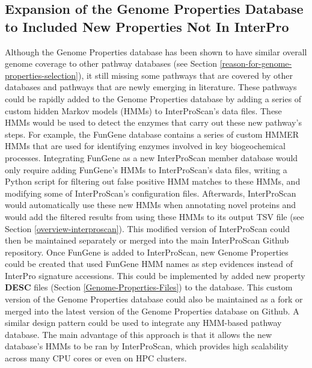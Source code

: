 \subsection{Expansion of the Genome Properties Database to Included New Properties Not In InterPro}

Although the Genome Properties database has been shown to have similar overall genome coverage to other pathway databases (see Section \ref{reason-for-genome-properties-selection}), it still missing some pathways that are covered by other databases and pathways that are newly emerging in literature. These pathways could be rapidly added to the Genome Properties database by adding a series of custom hidden Markov models (HMMs) \cite{eddy2011accelerated} to InterProScan's data files. These HMMs would be used to detect the enzymes that carry out these new pathway's steps. For example, the FunGene \cite{fish2013fungene} database contains a series of custom HMMER \cite{eddy2011accelerated} HMMs that are used for identifying enzymes involved in key biogeochemical processes. Integrating FunGene as a new InterProScan member database would only require adding FunGene's HMMs to InterProScan's data files, writing a Python script for filtering out false positive HMM matches to these HMMs, and modifying some of InterProScan's configuration files. Afterwards, InterProScan would automatically use these new HMMs when annotating novel proteins and would add the filtered results from using these HMMs to its output TSV file (see Section \ref{overview-interproscan}). This modified version of InterProScan could then be maintained separately or merged into the main InterProScan Github repository. Once FunGene is added to InterProScan, new Genome Properties could be created that used FunGene HMM names as step evidences instead of InterPro signature accessions. This could be implemented by added new property \textbf{DESC} files (Section \ref{Genome-Properties-Files}) to the database. This custom version of the Genome Properties database could also be maintained as a fork or merged into the latest version of the Genome Properties database on Github. A similar design pattern could be used to integrate any HMM-based pathway database. The main advantage of this approach is that it allows the new database's HMMs to be ran by InterProScan, which provides high scalability across many CPU cores or even on HPC clusters.

